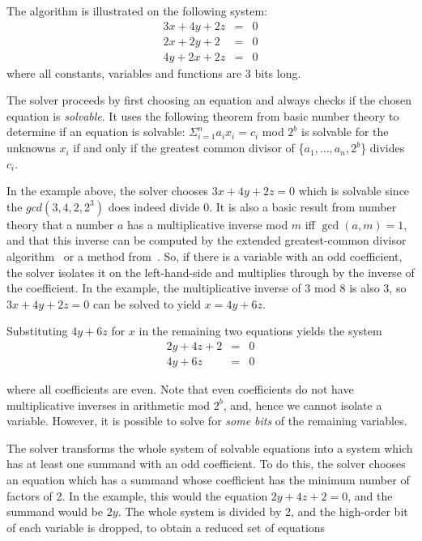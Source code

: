 

The algorithm is illustrated on the following system:
\begin{eqnarray}
3x + 4y + 2z &=& 0\nonumber\\
2x + 2y + 2 &=& 0 \nonumber\\
4y + 2x + 2z &=& 0\nonumber
\end{eqnarray}
where all constants, variables and functions are 3 bits long. 

The solver proceeds by first choosing an equation and always checks if
the chosen equation is {\it solvable}. It uses the following theorem
from basic number theory to determine if an equation is solvable:
$\Sigma_{i=1}^n a_ix_i = c_i$ mod $2^b$ is solvable for the unknowns
$x_i$ if and only if the greatest common divisor of
\{$a_1,\ldots,a_n,2^b$\} divides $c_i$.

In the example above, the solver chooses $3x + 4y + 2z = 0$ which is
solvable since the $gcd(3,4,2,2^3)$ does indeed divide $0$. It is also
a basic result from number theory that a number $a$ has a
multiplicative inverse mod $m$ iff $\gcd(a, m) = 1$, and that this
inverse can be computed by the extended greatest-common divisor
algorithm~\cite{CLR} or a method from~\cite{BDL98}. So, if there is a
variable with an odd coefficient, the solver isolates it on the
left-hand-side and multiplies through by the inverse of the
coefficient.  In the example, the multiplicative inverse of $3$ mod
$8$ is also $3$, so $3x + 4y + 2z = 0$ can be solved to yield $x = 4y
+ 6z$.

Substituting $4y+6z$ for $x$ in the remaining two equations yields the
system 
\begin{eqnarray}
2y + 4z + 2 &=& 0 \nonumber\\
4y + 6z &=& 0\nonumber
\end{eqnarray}

where all coefficients are even. Note that even coefficients do not
have multiplicative inverses in arithmetic mod $2^b$, and, hence we
cannot isolate a variable. However, it is possible to solve for {\em
some bits\/} of the remaining variables.

The solver transforms the whole system of solvable equations into a
system which has at least one summand with an odd coefficient. To do
this, the solver chooses an equation which has a summand whose
coefficient has the minimum number of factors of 2. In the example,
this would the equation $2y + 4z + 2 =0$, and the summand would be
$2y$. The whole system is divided by 2, and the high-order bit of each
variable is dropped, to obtain a reduced set of equations

